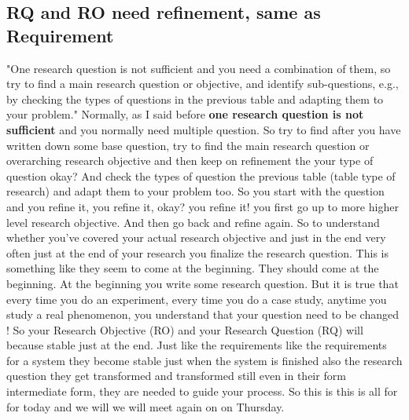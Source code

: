 \documentclass[conference, compsoc, twoside]{IEEEtran}
\begin{document}
\subsection{RQ and RO need refinement, same as Requirement} %
"One research question is not sufficient and you need a combination of them, so try to find a main research question or objective, and identify sub-questions, e.g., by checking the types of questions in the previous table and adapting them to your problem."
Normally, as I said before \textbf{one research question is not sufficient} and you normally need multiple question.
So try to find after you have written down some base question, try to find the main research question or overarching research objective and then keep on refinement the your type of question okay? 
And check the types of question the previous table (table type of research) and adapt them to your problem too.
So you start with the question and you refine it, you refine it, okay? 
you refine it! you first go up to more higher level research objective.
And then go back and refine again.
So to understand whether you've covered your actual research objective and just in the end very often just at the end of your research you finalize the research question.
This is something like they seem to come at the beginning.
They should come at the beginning.
At the beginning you write some research question. But it is true that 
every time you do an experiment, 
every time you do a case study,
anytime you study a real phenomenon, you understand that your question need to be changed ! 
So your Research Objective (RO) and your Research Question (RQ) will because stable just at the end. 
Just like the requirements like the requirements for a system they become stable just when the system is finished also the research question they get transformed and transformed still even in their form intermediate form, they are needed to guide your process.
So this is this is all for for today and we will we will meet again on on Thursday.

\end{document}
